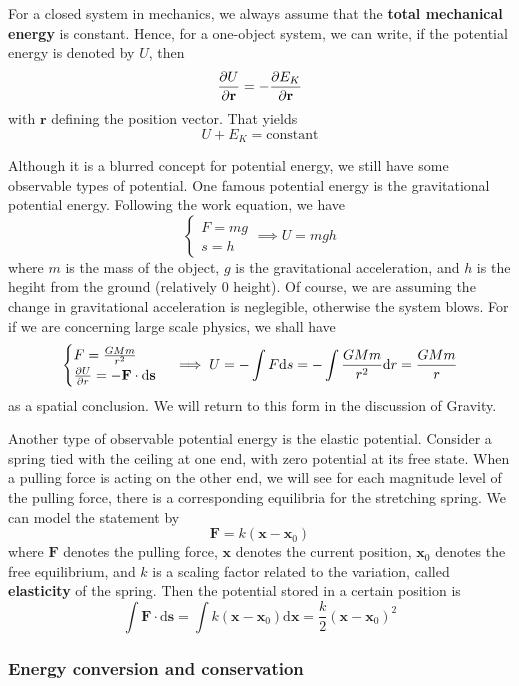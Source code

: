 \documentclass[12pt]{article}
\renewcommand{\d}[1]{\mathrm{d}{#1}}
\begin{document}
    For a closed system in mechanics, we always assume that the \textbf{total mechanical energy} is constant. Hence, for a one-object system, we can write, if the potential energy is denoted by $U$, then \[\partialderivative{U}{\mathbf{r}}=-\partialderivative{E_K}{\mathbf{r}}\] with $\mathbf{r}$ defining the position vector. That yields \[U+E_K= \mathrm{constant}\]

    Although it is a blurred concept for potential energy, we still have some observable types of potential. One famous potential energy is the gravitational potential energy. Following the work equation, we have \[\begin{cases}
        F=mg\\
        s=h
    \end{cases}\implies U=mgh\] where $m$ is the mass of the object, $g$ is the gravitational acceleration, and $h$ is the hegiht from the ground (relatively 0 height). Of course, we are assuming the change in gravitational acceleration is neglegible, otherwise the system blows. For if we are concerning large scale physics, we shall have \[\begin{cases}
        F=\frac{GMm}{r^2}\\
        \partialderivative{U}{r}=-\mathbf{F\cdot \d{s}}
    \end{cases}\implies U=-\int F \d{s} = -\int \frac{GMm}{r^2} \d{r} = \frac{GMm}{r}\] as a spatial conclusion. We will return to this form in the discussion of Gravity.

    Another type of observable potential energy is the elastic potential. Consider a spring tied with the ceiling at one end, with zero potential at its free state. When a pulling force is acting on the other end, we will see for each magnitude level of the pulling force, there is a corresponding equilibria for the stretching spring. We can model the statement by \[\mathbf{F}=k(\mathbf{x-x}_0)\] where $\mathbf{F}$ denotes the pulling force, $\mathbf{x}$ denotes the current position, $\mathbf{x}_0$ denotes the free equilibrium, and $k$ is a scaling factor related to the variation, called \textbf{elasticity} of the spring. Then the potential stored in a certain position is \[\int \mathbf{F\cdot \d{s}} = \int k(\mathbf{x-x}_0) \d{\mathbf{x}} = \frac{k}{2}(\mathbf{x-x}_0)^2\]

    \subsubsection*{Energy conversion and conservation}
\end{document}
